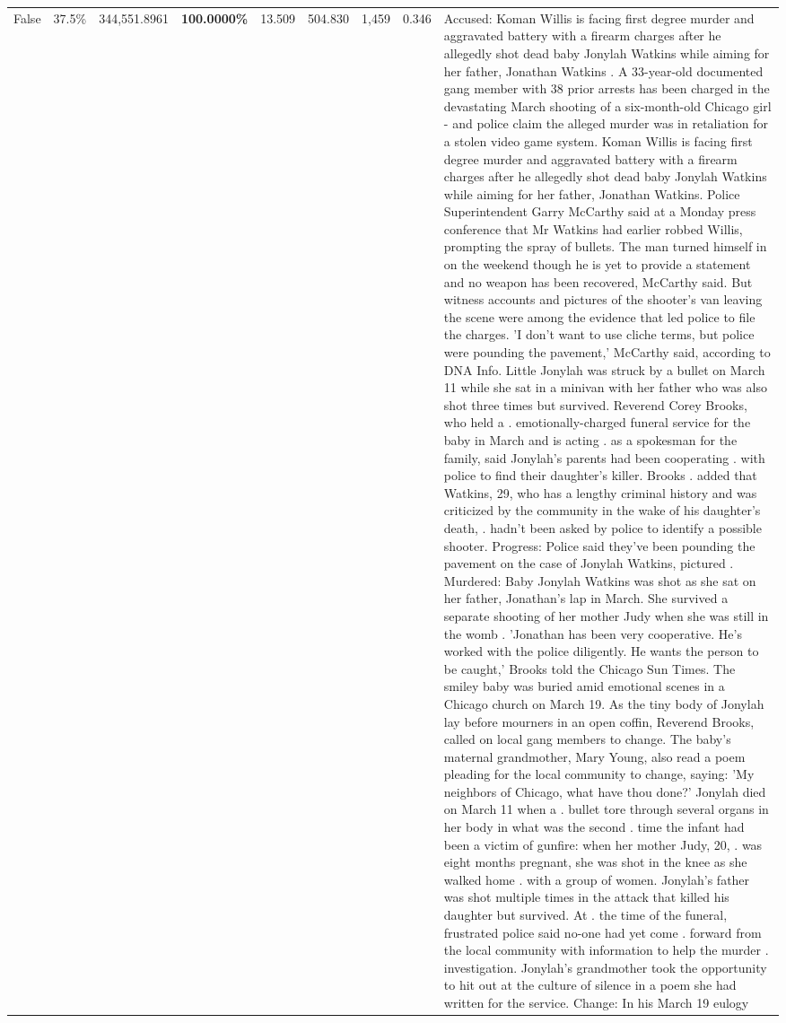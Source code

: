 \begin{table}[H]
\begin{tabular}{lllrlllll}
False & 37.5\% & 344,551.8961 & \bfseries \color{red} 100.0000\% & 13.509 & 504.830 & 1,459 & 0.346 & Accused: Koman Willis is facing first degree murder and aggravated battery with a firearm charges after he allegedly shot dead baby Jonylah Watkins while aiming for her father, Jonathan Watkins . A 33-year-old documented gang member with 38 prior arrests has been charged in the devastating March shooting of a six-month-old Chicago girl - and police claim the alleged murder was in retaliation for a stolen video game system. Koman Willis is facing first degree murder and aggravated battery with a firearm charges after he allegedly shot dead baby Jonylah Watkins while aiming for her father, Jonathan Watkins. Police Superintendent Garry McCarthy said at a Monday press conference that Mr Watkins had earlier robbed Willis, prompting the spray of bullets. The man turned himself in on the weekend though he is yet to provide a statement and no weapon has been recovered, McCarthy said. But witness accounts and pictures of the shooter's van leaving the scene were among the evidence that led police to file the charges. 'I don't want to use cliche terms, but police were pounding the pavement,' McCarthy said, according to DNA Info. Little Jonylah was struck by a bullet on March 11 while she sat in a minivan with her father who was also shot three times but survived. Reverend Corey Brooks, who held a . emotionally-charged funeral service for the baby in March and is acting . as a spokesman for the family, said Jonylah's parents had been cooperating . with police to find their daughter's killer. Brooks . added that Watkins, 29, who has a lengthy criminal history and was criticized by the community in the wake of his daughter's death, . hadn't been asked by police to identify a possible shooter. Progress: Police said they've been pounding the pavement on the case of Jonylah Watkins, pictured . Murdered: Baby Jonylah Watkins was shot as she sat on her father, Jonathan's lap in March. She survived a separate shooting of her mother Judy when she was still in the womb . 'Jonathan has been very cooperative. He's worked with the police diligently. He wants the person to be caught,' Brooks told the Chicago Sun Times. The smiley baby was buried amid emotional scenes in a Chicago church on March 19. As the tiny body of Jonylah lay before mourners in an open coffin, Reverend Brooks, called on local gang members to change. The baby's maternal grandmother, Mary Young, also read a poem pleading for the local community to change, saying: 'My neighbors of Chicago, what have thou done?' Jonylah died on March 11 when a . bullet tore through several organs in her body in what was the second . time the infant had been a victim of gunfire: when her mother Judy, 20, . was eight months pregnant, she was shot in the knee as she walked home . with a group of women. Jonylah's father was shot multiple times in the attack that killed his daughter but survived. At . the time of the funeral, frustrated police said no-one had yet come . forward from the local community with information to help the murder . investigation. Jonylah's grandmother took the opportunity to hit out at the culture of silence in a poem she had written for the service. Change: In his March 19 eulogy 
\end{tabular}
\end{table}
